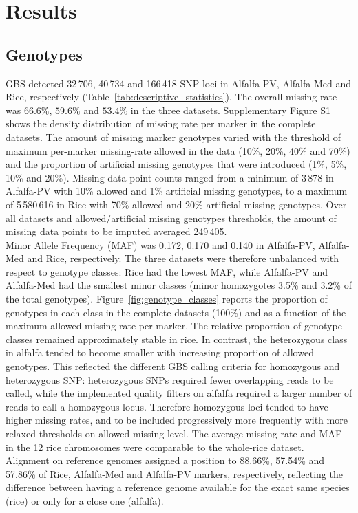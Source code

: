  
\makeatletter{}\section{Results}
\label{sec:results}

\subsection{Genotypes}
\label{sec:genotypes}  
GBS detected 32\,706, 40\,734 and 166\,418 SNP loci in Alfalfa-PV, Alfalfa-Med and Rice, respectively (Table~\ref{tab:descriptive_statistics}). The overall missing rate was $66.6\%$, $59.6\%$ and $53.4\%$ in the three datasets. Supplementary Figure S1 shows the density distribution of missing rate per marker in the complete datasets. The amount of missing marker genotypes varied with the threshold of maximum per-marker missing-rate allowed in the data (10\%, 20\%, 40\% and 70\%) and the proportion of artificial missing genotypes that were introduced (1\%, 5\%, 10\% and 20\%). Missing data point counts ranged from a minimum of 3\,878 in Alfalfa-PV with 10\% allowed and 1\% artificial missing genotypes, to a maximum of 5\,580\,616 in Rice with 70\% allowed and 20\% artificial missing genotypes. Over all datasets and allowed/artificial missing genotypes thresholds, the amount of missing data points to be imputed averaged 249\,405.\\
Minor Allele Frequency (MAF) was 0.172, 0.170 and 0.140 in Alfalfa-PV, Alfalfa-Med and Rice, respectively. The three datasets were therefore unbalanced with respect to genotype classes: Rice had the lowest MAF, while Alfalfa-PV and Alfalfa-Med had the smallest minor classes (minor homozygotes 3.5\% and 3.2\% of the total genotypes). Figure~\ref{fig:genotype_classes} reports the proportion of genotypes in each class in the complete datasets (100\%) and as a function of the maximum allowed missing rate per marker. The relative proportion of genotype classes remained approximately stable in rice. In contrast, the heterozygous class in alfalfa tended to become smaller with increasing proportion of allowed genotypes. This reflected the different GBS calling criteria for homozygous and heterozygous SNP: heterozygous SNPs required fewer overlapping reads to be called, while the implemented quality filters on alfalfa required a larger number of reads to call a homozygous locus. Therefore homozygous loci tended to have higher missing rates, and to
be included progressively more frequently with more relaxed thresholds on allowed missing level.
The average missing-rate and MAF in the 12 rice chromosomes were comparable to the whole-rice dataset.\\
Alignment on reference genomes assigned a position to 88.66\%, 57.54\% and 57.86\% of Rice, Alfalfa-Med and Alfalfa-PV markers, respectively, reflecting the difference between having a reference genome available for the exact same species (rice) or only for a close one (alfalfa).

